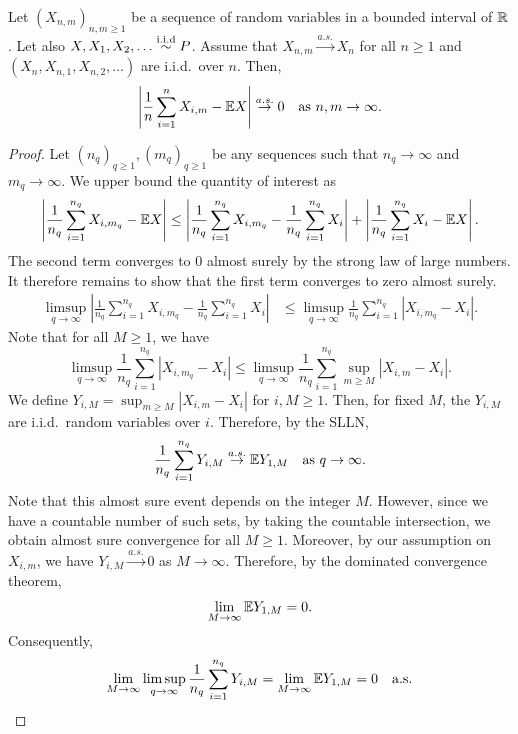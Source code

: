 \begin{lemma}\label{lemma::triangularslln}
Let $(X_{n,m})_{n,m\geq 1}$ be a sequence of random variables in a bounded interval of $\mathbb{R}$. Let also $X,X_1,X_2,\dots \overset{\mathrm{i.i.d}}{\sim}P$. Assume that $X_{n,m}\overset{a.s.}{\to}X_n$ for all $n \geq 1$ and $(X_n,X_{n,1},X_{n,2},\dots)$ are i.i.d.\ over $n$. Then,
\[
\left| \frac{1}{n} \sum_{i = 1}^n X_{i,m} - \mathbb{E} X\right| \overset{a.s.}{\to} 0 \quad \text{as } n,m\to \infty.
\]
\end{lemma}
\begin{proof}
Let $(n_q)_{q \geq 1}, (m_q)_{q \geq 1}$ be any sequences such that $n_q \to \infty$ and $m_q \to \infty$. We upper bound the quantity of interest as
\[
\left|\frac{1}{n_q}\sum_{i = 1}^{n_q} X_{i, m_q} - \mathbb{E} X \right| \leq 
\left|\frac{1}{n_q}\sum_{i = 1}^{n_q} X_{i, m_q} - \frac{1}{n_q}\sum_{i = 1}^{n_q}X_i \right|
+ \left|\frac{1}{n_q}\sum_{i = 1}^{n_q} X_i - \mathbb{E} X \right|.
\]
The second term converges to $0$ almost surely by the strong law of large numbers. It therefore remains to show that the first term converges to zero almost surely.
\begin{align*}
\limsup_{q \to \infty}\left|\frac{1}{n_q}\sum_{i = 1}^{n_q} X_{i, m_q} - \frac{1}{n_q}\sum_{i = 1}^{n_q}X_i \right| & 
\leq \limsup_{q \to \infty}\frac{1}{n_q}\sum_{i = 1}^{n_q}\left|X_{i,m_q} - X_i \right|.
\end{align*}
Note that for all $M \geq 1$, we have
\[
\limsup_{q \to \infty}\frac{1}{n_q}\sum_{i = 1}^{n_q}\left|X_{i,m_q} - X_i \right|
\leq \limsup_{q \to \infty} \frac{1}{n_q}\sum_{i = 1}^{n_q} \sup_{m \geq M} \left|X_{i, m} - X_i \right|.
\]
We define $Y_{i,M} = \sup_{m \geq M}\left| X_{i, m} - X_i\right|$ for $i, M\geq 1$. Then, for fixed $M$, the $Y_{i,M}$ are i.i.d.\ random variables over $i$. Therefore, by the SLLN,
\[
\frac{1}{n_q}\sum_{i = 1}^{n_q}Y_{i,M} \overset{a.s.}{\to} \mathbb{E} Y_{1,M} \quad \text{as } q \to \infty.
\]
Note that this almost sure event depends on the integer $M$. However, since we have a countable number of such sets, by taking the countable intersection, we obtain almost sure convergence for all $M\geq 1$. Moreover, by our assumption on $X_{i,m}$, we have $Y_{i,M} \overset{a.s.}{\to} 0$ as $M \to \infty$. Therefore, by the dominated convergence theorem,
\[
\lim_{M \to \infty}\mathbb{E} Y_{1,M} = 0.
\]
Consequently,
\[
\lim_{M \to \infty}\limsup_{q \to \infty}\frac{1}{n_q}\sum_{i = 1}^{n_q}Y_{i,M} = \lim_{M \to \infty} \mathbb{E} Y_{1,M} = 0 \quad \text{a.s.}
\]
\end{proof}

